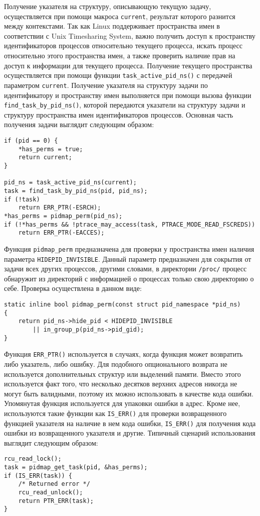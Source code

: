 Получение указателя на структуру, описывающую текущую задачу, осуществляется при
помощи макроса \texttt{current}, результат которого разнится между контекстами.
Так как Linux поддерживает пространства имен в соответствии с Unix Timesharing
System, важно получить доступ к пространству идентификаторов процессов
относительно текущего процесса, искать процесс относительно этого пространства
имен, а также проверить наличие прав на доступ к информации для текущего
процесса. Получение текущего пространства осуществляется при помощи функции
\texttt{task\_active\_pid\_ns()} с передачей параметром \texttt{current}.
Получение указателя на структуру задачи по идентификатору и пространству имен
выполняется при помощи вызова функции \texttt{find\_task\_by\_pid\_ns()},
которой передаются указатели на структуру задачи и структуру пространства имен
идентификаторов процессов. Основная часть получения задачи выглядит следующим
образом:
\medskip
\begin{lstlisting}[style=cstyle]
if (pid == 0) {
	*has_perms = true;
	return current;
}

pid_ns = task_active_pid_ns(current);
task = find_task_by_pid_ns(pid, pid_ns);
if (!task)
	return ERR_PTR(-ESRCH);
*has_perms = pidmap_perm(pid_ns);
if (!*has_perms && !ptrace_may_access(task, PTRACE_MODE_READ_FSCREDS))
	return ERR_PTR(-EACCES);
\end{lstlisting}
\medskip

Функция \texttt{pidmap\_perm} предназначена для проверки у пространства имен
наличия параметра \texttt{HIDEPID\_INVISIBLE}. Данный параметр предназначен для
сокрытия от задачи всех других процессов, другими словами, в директории
\texttt{/proc/} процесс обнаружит из директорий с информацией о процессах
только свою директорию о себе. Проверка осуществлена в данном виде:
\medskip
\begin{lstlisting}[style=cstyle]
static inline bool pidmap_perm(const struct pid_namespace *pid_ns)
{
	return pid_ns->hide_pid < HIDEPID_INVISIBLE
		|| in_group_p(pid_ns->pid_gid);
}
\end{lstlisting}
\medskip

Функция \texttt{ERR\_PTR()} используется в случаях, когда функция может
возвратить либо указатель, либо ошибку. Для подобного опционального возврата
не используется дополнительных структур или выделений памяти. Вместо этого
используется факт того, что несколько десятков верхних адресов никогда не могут
быть валидными, поэтому их можно использовать в качестве кода ошибки. Упомянутая
функция используется для упаковки ошибки в адрес. Кроме нее, используются такие
функции как \texttt{IS\_ERR()} для проверки возвращенного функцией указателя на
наличие в нем кода ошибки, \texttt{IS\_ERR()} для получения кода ошибки из
возвращенного указателя и другие. Типичный сценарий использования выглядит
следующим образом:
\medskip
\begin{lstlisting}[style=cstyle]
rcu_read_lock();
task = pidmap_get_task(pid, &has_perms);
if (IS_ERR(task)) {
	/* Returned error */
	rcu_read_unlock();
	return PTR_ERR(task);
}
\end{lstlisting}
\medskip

